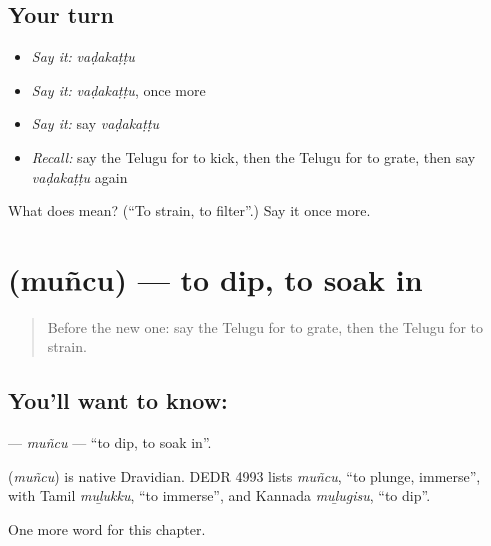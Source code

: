 \subsection*{Your turn}
\begin{itemize}
\raggedright
  \item \emph{Say it:} \emph{vaḍakaṭṭu}
  \item \emph{Say it:} \emph{vaḍakaṭṭu}, once more
  \item \emph{Say it:} say \emph{vaḍakaṭṭu}
  \item \emph{Recall:} say the Telugu for to kick, then the Telugu for to grate, then say \emph{vaḍakaṭṭu} again
\end{itemize}

\begin{tcolorbox}[breakable,colback=teal!4,colframe=teal!35!black,title={Before you move on}]
What does  mean? (\textquotedblleft{}To strain, to filter\textquotedblright{}.) Say it once more.
\end{tcolorbox}
\section[\texorpdfstring{\te{ముంచు} (muñcu)}{ముంచు (muñcu)}]{ (muñcu) — to dip, to soak in}

\label{lesson:TE-C164-muncu}



\begin{quote}
Before the new one: say the Telugu for to grate, then the Telugu for to strain.
\end{quote}

\subsection*{You'll want to know: }
\textbf{} — \emph{muñcu} — \textquotedblleft{}to dip, to soak in\textquotedblright{}.

\begin{cousinweb}
\textbf{} (\emph{muñcu}) is native Dravidian. DEDR 4993 lists \emph{muñcu}, \textquotedblleft{}to plunge, immerse\textquotedblright{}, with Tamil \emph{muḻukku}, \textquotedblleft{}to immerse\textquotedblright{}, and Kannada \emph{muḻugisu}, \textquotedblleft{}to dip\textquotedblright{}.
\end{cousinweb}

\begin{grammarlens}[title={What you've built}]
One more word for this chapter.
\end{grammarlens}

